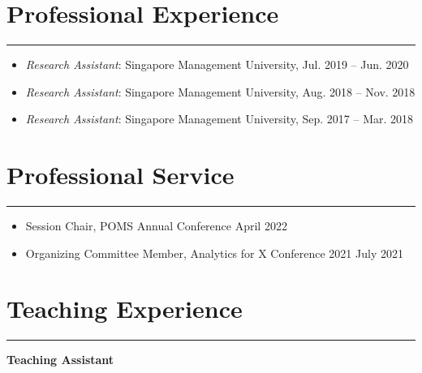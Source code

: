 \documentclass[12pt, a4paper]{article}
\begin{document}
{\section*{Professional Experience}
\vspace*{0.4em}
\hrule height 0.5pt
\begin{itemize}[leftmargin=36pt, itemsep=0pt, parsep=0.2pt, topsep=1pt]

	\item {\it Research Assistant}: Singapore Management University, Jul. 2019 -- Jun. 2020

	\item {\it Research Assistant}: Singapore Management University, Aug. 2018 -- Nov. 2018

  \item {\it Research Assistant}: Singapore Management University, Sep. 2017 -- Mar. 2018

\end{itemize}




\section*{Professional Service}
\vspace*{0.4em}
\hrule height 0.5pt
\begin{itemize}[leftmargin=36pt, itemsep=2pt, parsep=0pt, topsep=1pt]
	
	\item Session Chair, POMS Annual Conference \hfill April 2022

	\item Organizing Committee Member, Analytics for X Conference 2021 \hfill July 2021

\end{itemize}




\section*{Teaching Experience}
\vspace*{0.4em}
\hrule height 0.5pt
\raggedright\textbf{Teaching Assistant}
\begin{itemize}[leftmargin=36pt, itemsep=2pt, parsep=0pt, topsep=-0.5em]


\end{itemize}}
\end{document}

